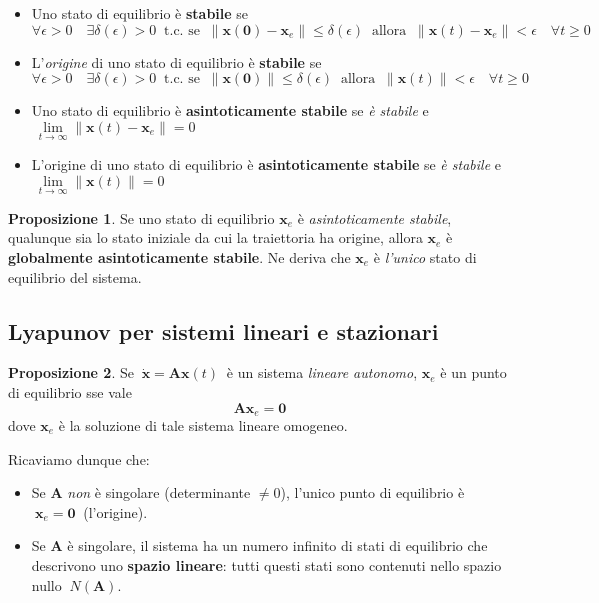 \documentclass[a4paper]{article}
\renewcommand{\vec}{\bm}
\theoremstyle{definition}
\newtheorem{prop}{Proposizione}[subsection]
\begin{document}
				\begin{itemize}
					\item Uno stato di equilibrio è \textbf{stabile} se 
					\[
					\forall\epsilon > 0 \quad\exists \delta(\epsilon) > 0\ \text{ t.c. se }\ \| \vec{x}(\vec{0}) - \vec{x}_e \| \leq \delta(\epsilon)\ \text{ allora }\ \| \vec{x}(t) - \vec{x}_e \| < \epsilon\quad  \forall t\geq 0
					\]
					\item L'\textit{origine} di uno stato di equilibrio è \textbf{stabile} se 
					\[
					\forall\epsilon > 0 \quad\exists \delta(\epsilon) > 0\ \text{ t.c. se }\ \| \vec{x}(\vec{0}) \| \leq \delta(\epsilon)\ \text{ allora }\ \| \vec{x}(t) \| < \epsilon\quad  \forall t\geq 0
					\]
					\item Uno stato di equilibrio è \textbf{asintoticamente stabile} se \textit{è stabile} e
					$\ \lim\limits_{t\rightarrow\infty} \| \vec{x}(t) - \vec{x}_e \| = 0 $
					
					\item L'origine di uno stato di equilibrio è \textbf{asintoticamente stabile} se \textit{è stabile} e
					$\ \lim\limits_{t\rightarrow\infty} \| \vec{x}(t) \| = 0 $
					
				\end{itemize}
				
				\begin{prop}
					Se uno stato di equilibrio $ \vec{x}_e $ è \textit{asintoticamente stabile}, qualunque sia lo stato iniziale da cui la traiettoria ha origine, allora $ \vec{x}_e $ è \textbf{globalmente asintoticamente stabile}. Ne deriva che $ \vec{x}_e $ è \textit{l'unico} stato di equilibrio del sistema.
				\end{prop}
				
			
			\subsection{Lyapunov per sistemi lineari e stazionari}	
			
				\begin{prop}
					Se $ \ \dot{\vec{x}} = \vec{A}\vec{x}(t)\ $ è un sistema \textit{lineare autonomo}, $ \vec{x}_e $ è un punto di equilibrio sse vale
					\[
						\vec{A}\vec{x}_e  = \vec{0}
					\]
					dove $ \vec{x}_e $ è la soluzione di tale sistema lineare omogeneo.
				\end{prop}
				
				\noindent
				Ricaviamo dunque che:
				\begin{itemize}
					\item Se $ \vec{A} $ \textit{non} è singolare (determinante $ \neq 0 $), l'unico punto di equilibrio è $\ \vec{x}_e = \vec{0}\ $ (l'origine).
					\item Se $ \vec{A} $ è singolare, il sistema ha un numero infinito di stati di equilibrio che descrivono uno \textbf{spazio lineare}: tutti questi stati sono contenuti nello spazio nullo $\ N(\vec{A}) $.
				\end{itemize}
	
\end{document}

